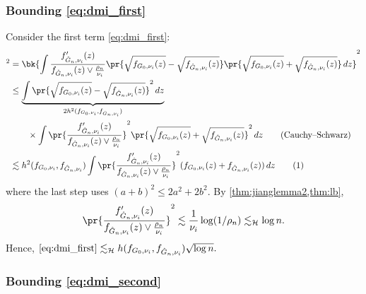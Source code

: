 \documentclass[12pt, reqno]{amsart}
\newcommand\numberthis{\addtocounter{equation}{1}\tag{\theequation}}
\newcommand{\leH}{\lesssim_{\mathcal{H}}}
\numberwithin{equation}{section}
\begin{document}
\begin{refsection}
\begin{appendices}
\subsubsection{Bounding \eqref{eq:dmi_first}}

Consider the first term \eqref{eq:dmi_first}:
\begin{align*}
[\eqref{eq:dmi_first}]^2
 &= \bk{\int
\frac{f'_{\hat G_n, \nu_i}
(z)}{
f_{\hat G_n, \nu_i}(z)
 \vee \frac{\rho_n}{\nu_i}}
  \pr{\sqrt{f_{G_0,\nu_i}(z)}
-    \sqrt{f_{\hat G_n, \nu_i} ( z)}}
\pr{\sqrt{f_{G_0,\nu_i}(z)}
+   \sqrt{f_{\hat G_n, \nu_i} ( z)}}
 \,dz}^2
 \\
 &\le
 \underbrace{\int \pr{\sqrt{f_{G_0,\nu_i}(z)}
 -    \sqrt{f_{\hat G_n,  \nu_i} ( z)}}^2 \,dz }_{2 h^2 (f_{G_0,\nu_i},  f_{\hat G_n, 
 \nu_i} ) }
 \\&\quad\quad\times \int \pr{\frac{f'_{\hat G_n, \nu_i}
(z)}{
f_{\hat G_n, \nu_i}(z)
 \vee \frac{\rho_n}{\nu_i}}}^2 \pr{\sqrt{f_{G_0,\nu_i}(z)}
+   \sqrt{f_{\hat G_n,  \nu_i} ( z)}}^2 \,dz
 \tag{Cauchy--Schwarz}
 \\
 &\lesssim h^2(f_{G_0, \nu_i}, f_{\hat G_n, \nu_i}) 
 \int \pr{\frac{f'_{\hat G_n, \nu_i}
(z)}{
f_{\hat G_n, \nu_i}(z)
 \vee \frac{\rho_n}{\nu_i}}}^2 (f_{G_0,\nu_i}(z)
+   f_{\hat G_n,  \nu_i} ( z))\,dz
 \numberthis \label{eq:u1m_computation}
\end{align*}
where the last step uses $(a+b)^2 \le 2a^2 + 2b^2$. By \cref{thm:jianglemma2,thm:lb}, \[
\pr{\frac{f'_{\hat G_n, \nu_i}
(z)}{
f_{\hat G_n, \nu_i}(z)
 \vee \frac{\rho_n}{\nu_i}}}^2 \lesssim \frac{1}{
    \nu_i
} \log(1/\rho_n) \leH \log n.
\]
Hence, $
\eqref{eq:dmi_first} \leH  h(f_{G_0, \nu_i}, f_{\hat
G_n,
\nu_i}) \sqrt{\log n}.
$


\subsubsection{Bounding \eqref{eq:dmi_second}}


\end{appendices}
\end{refsection}
\end{document}
